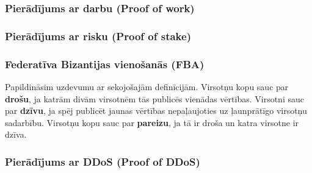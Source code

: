 \subsubsection{Pierādījums ar darbu (Proof of work)}
\subsubsection{Pierādījums ar risku (Proof of stake)}
\subsubsection{Federatīva Bizantijas vienošanās (FBA)}
Papildināsim uzdevumu ar sekojošajām definīcijām.
Virsotņu kopu sauc par \textbf{drošu}, ja katrām divām virsotnēm tās publicēs vienādas vērtības.
Virsotni sauc par \textbf{dzīvu}, ja spēj publicēt jaunas vērtības nepaļaujoties uz ļaunprātīgo virsotņu sadarbību.
Virsotņu kopu sauc par \textbf{pareizu}, ja tā ir droša un katra virsotne ir dzīva.
\subsubsection{Pierādījums ar DDoS (Proof of DDoS)}






